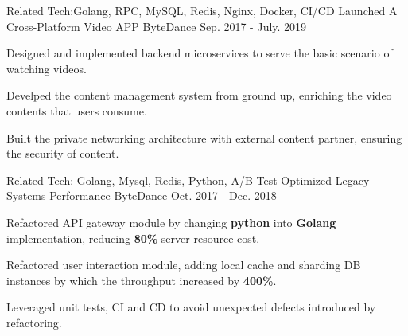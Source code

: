 \begin{cventries}

  \cventrynew
    {Related Tech:Golang, RPC, MySQL, Redis, Nginx, Docker, CI/CD} %
    {Launched A Cross-Platform Video APP} %
    {ByteDance} %
    {Sep. 2017 - July. 2019}
    {
      \begin{cvitems} 
        \item {Designed and implemented backend microservices to serve the basic scenario of watching videos.} %
        \item {Develped the content management system from ground up, enriching the video contents that users consume.}
        \item {Built the private networking architecture with external content partner, ensuring the security of content.} %
      \end{cvitems}
    }
  \cventrynew
    {Related Tech: Golang, Mysql, Redis, Python, A/B Test} %
    {Optimized Legacy Systems Performance} %
    {ByteDance} %
    {Oct. 2017 - Dec. 2018} %
    {
      \begin{cvitems} 
        \item {Refactored API gateway module by changing \textbf{python} into \textbf{Golang} implementation, reducing \textbf{80\%} server resource cost.}
        \item {Refactored user interaction module, adding local cache and sharding DB instances by which the throughput increased by \textbf{400\%}.}
        \item {Leveraged unit tests, CI and CD to avoid unexpected defects introduced by refactoring.}
      \end{cvitems}
    }



\end{cventries}
